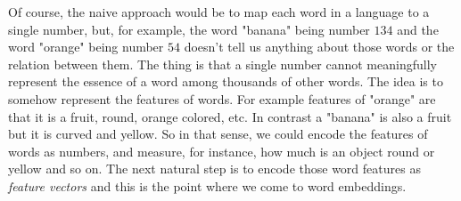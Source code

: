 \documentclass[12pt]{article}
\numberwithin{equation}{section}
\begin{document}
\begin{spacing}{1.5}
	Of course, the naive approach would be to map each word in a language to a single number, but, for example, the word "banana" being number $134$ and the word "orange" being number $54$ doesn't tell us anything about those words or the relation between them. The thing is that a single number cannot meaningfully represent the essence of a word among thousands of other words. The idea is to somehow represent the features of words. For example features of "orange" are that it is a fruit, round, orange colored, etc. In contrast a "banana" is also a fruit but it is curved and yellow. So in that sense, we could encode the features of words as numbers, and measure, for instance, how much is an object round or yellow and so on. The next natural step is to encode those word features as \textit{feature vectors} and this is the point where we come to word embeddings. \\
	

\end{spacing}
\end{document}
